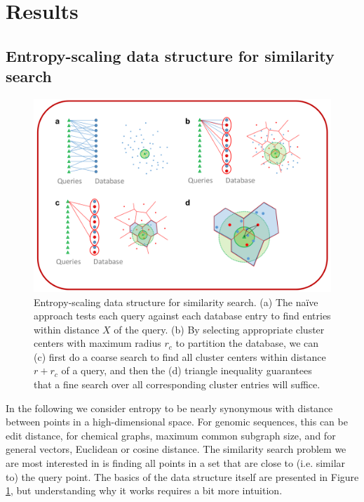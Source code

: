 \documentclass[review,preprint,12pt]{elsarticle}
\theoremstyle{definition}
\theoremstyle{remark}
\numberwithin{equation}{section}
\begin{document}
\section{Results}
\subsection{Entropy-scaling data structure for similarity search}
\begin{figure}[btp]
    \centering
    \includegraphics[width=1\textwidth]{assets/dataStructure.png}
    \caption{ Entropy-scaling data structure for similarity search. %
            (a) The na\"ive approach tests each query against each database entry to find entries within distance $X$  of the query. %
            (b) By selecting appropriate cluster centers with maximum radius $r_c$ to partition the database, we can (c) first do a coarse search to find all cluster centers within distance $r+r_c$ of a query, and then the (d) triangle inequality guarantees that a fine search over all corresponding cluster entries will suffice.}
    \label{fig:dataStructure}
\end{figure}

In the following we consider entropy to be nearly synonymous with distance between points in a high-dimensional space.
For genomic sequences, this can be edit distance, for chemical graphs, maximum common subgraph size, and for general vectors, Euclidean or cosine distance.
The similarity search problem we are most interested in is finding all points in a set that are close to (i.e. similar to) the query point.
The basics of the data structure itself are presented in Figure \ref{fig:dataStructure}, but understanding why it works requires a bit more intuition.
\end{document}
